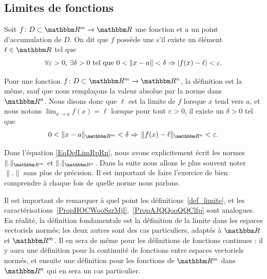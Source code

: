 \subsection{Limites de fonctions}

\begin{definition}\label{def_limite}
	Soit $f\colon D\subset\eR^m\to \eR$ une fonction et $a$ un point d'accumulation de $D$.  On dit que $f$ possède une  s'il existe un élément $\ell\in\eR$ tel que
	\begin{equation}		\label{Eq2807CondiionLimifnm}
		\forall\varepsilon>0,\,\exists\delta>0\text{ tel que } 0<\| x-a \|<\delta\Rightarrow | f(x)-\ell |<\varepsilon.
	\end{equation}

	Pour une fonction $f\colon D\subset\eR^m\to \eR^n$, la définition est la même, sauf que nous remplaçons la valeur absolue par la norme dans $\eR^n$. Nous disons donc que $\ell$ est la limite de $f$ lorsque $x$ tend vers $a$, et nous notons $\lim_{x\to a} f(x)=\ell$ lorsque pour tout $\varepsilon>0$, il existe un $\delta>0$ tel que
	\begin{equation}		\label{EqDefLimRpRn}
		0<\| x-a \|_{\eR^m}<\delta\Rightarrow\,\| f(x)-\ell \|_{\eR^n}<\varepsilon.
	\end{equation}
\end{definition}

\begin{remark}
	Dans l'équation \eqref{EqDefLimRpRn}, nous avons explicitement écrit les normes $\| . \|_{\eR^m}$ et $\| . \|_{\eR^n}$. Dans la suite nous allons le plus souvent noter $\| . \|$ sans plus de précision. Il est important de faire l'exercice de bien comprendre à chaque fois de quelle norme nous parlons.
\end{remark}

\begin{remark}
	Il est important de remarquer à quel point les définitions~\ref{def_limite}, et les caractérisations~\ref{PropHOCWooSzrMjl},~\ref{PropAJQQooQQClfp} sont analogues. En réalité, la définition fondamentale est la définition de la limite dans les espaces vectoriels normés; les deux autres sont des cas particuliers, adaptés à $\eR$ et $\eR^m$. Il en sera de même pour les définitions de fonctions continues : il y aura une définition pour la continuité de fonctions entre espaces vectoriels normés, et ensuite une définition pour les fonctions de $\eR^m$ dans $\eR^n$ qui en sera un cas particulier.
\end{remark}

